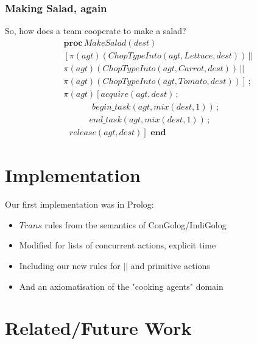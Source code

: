 \documentclass{beamer}
\begin{document}
\begin{frame}
\frametitle{Making Salad, again}
So, how does a team cooperate to make a salad?
\[
\begin{array}{c}
\mathbf{proc}\, MakeSalad(dest)\\
\left[\pi(agt)(ChopTypeInto(agt,Lettuce,dest))\,||\right.\\
\pi(agt)(ChopTypeInto(agt,Carrot,dest))\,||\\
\left.\pi(agt)(ChopTypeInto(agt,Tomato,dest))\right]\,;\\
\pi(agt)\left[acquire(agt,dest)\,;\right.\\
\,\,\,\,\,\,\,\,\,\,\,\,\,\,\,\,\,\,\,\, begin\_ task(agt,mix(dest,1))\,;\\
\,\,\,\,\,\,\,\,\,\,\,\,\,\,\,\,\,\, end\_ task(agt,mix(dest,1))\,;\\
\left.\,\,\,\, release(agt,dest)\right]\,\,\mathbf{end}\end{array}\]
\end{frame}

\section{Implementation}
Our first implementation was in Prolog:
\begin{itemize}
  \item $Trans$ rules from the semantics of ConGolog/IndiGolog
  \pause
  \item Modified for lists of concurrent actions, explicit time
  \pause
  \item Including our new rules for $||$ and primitive actions
  \pause
  \item And an axiomatisation of the "cooking agents" domain
\end{itemize}

\section{Related/Future Work}
\end{document}
